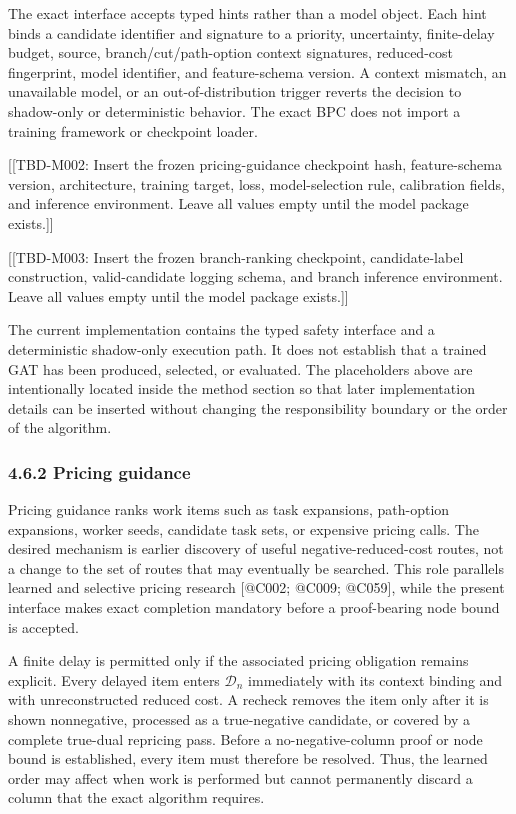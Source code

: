 \documentclass[
  11pt,
]{article}
\begin{document}
The exact interface accepts typed hints rather than a model object. Each
hint binds a candidate identifier and signature to a priority,
uncertainty, finite-delay budget, source, branch/cut/path-option context
signatures, reduced-cost fingerprint, model identifier, and
feature-schema version. A context mismatch, an unavailable model, or an
out-of-distribution trigger reverts the decision to shadow-only or
deterministic behavior. The exact BPC does not import a training
framework or checkpoint loader.

{[}{[}TBD-M002: Insert the frozen pricing-guidance checkpoint hash,
feature-schema version, architecture, training target, loss,
model-selection rule, calibration fields, and inference environment.
Leave all values empty until the model package exists.{]}{]}

{[}{[}TBD-M003: Insert the frozen branch-ranking checkpoint,
candidate-label construction, valid-candidate logging schema, and branch
inference environment. Leave all values empty until the model package
exists.{]}{]}

The current implementation contains the typed safety interface and a
deterministic shadow-only execution path. It does not establish that a
trained GAT has been produced, selected, or evaluated. The placeholders
above are intentionally located inside the method section so that later
implementation details can be inserted without changing the
responsibility boundary or the order of the algorithm.

\hypertarget{pricing-guidance}{%
\subsubsection{4.6.2 Pricing guidance}\label{pricing-guidance}}

Pricing guidance ranks work items such as task expansions, path-option
expansions, worker seeds, candidate task sets, or expensive pricing
calls. The desired mechanism is earlier discovery of useful
negative-reduced-cost routes, not a change to the set of routes that may
eventually be searched. This role parallels learned and selective
pricing research {[}@C002; @C009; @C059{]}, while the present interface
makes exact completion mandatory before a proof-bearing node bound is
accepted.

A finite delay is permitted only if the associated pricing obligation
remains explicit. Every delayed item enters \(\mathcal{D}_n\)
immediately with its context binding and with unreconstructed reduced
cost. A recheck removes the item only after it is shown nonnegative,
processed as a true-negative candidate, or covered by a complete
true-dual repricing pass. Before a no-negative-column proof or node
bound is established, every item must therefore be resolved. Thus, the
learned order may affect when work is performed but cannot permanently
discard a column that the exact algorithm requires.
\end{document}
